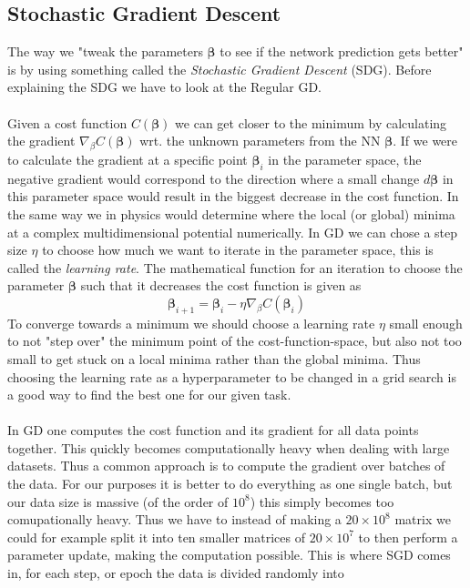 \documentclass[14pt, a4paper]{book}
\begin{document}
\subsection{Stochastic Gradient Descent}
The way we "tweak the parameters $\bm \beta $ to see if the network prediction gets better" is by using something called the \textit{Stochastic Gradient Descent} (SDG). Before explaining the SDG we have to look at the Regular GD. \\
\\Given a cost function $C(\bm{\beta})$ we can get closer to the minimum by calculating the gradient $\nabla_{\beta}C(\bm{\beta})$ wrt. the unknown parameters from the NN $\bm\beta$. If we were to calculate the gradient at a specific 
point $\bm{\beta}_i$ in the parameter space, the negative gradient would correspond to the direction where a small change $d\bm\beta$ in this parameter space would result in the biggest decrease in the cost function. 
In the same way we in physics would determine where the local (or global) minima at a complex multidimensional potential numerically. In GD we can chose a step size $\eta$ to choose how much we want to iterate in the parameter space, 
this is called the \textit{learning rate}. The mathematical function for an iteration to choose the parameter $\bm{\beta}$ such that it decreases the cost function is given as
\begin{equation}\label{eq:GD}
    \bm{\beta}_{i+1}=\bm{\beta}_{i} -\eta\nabla_{\beta}C(\bm{\beta}_i)
\end{equation}
To converge towards a minimum we should choose a learning rate $\eta$ small enough to not "step over" the minimum point of the cost-function-space, but also not too small to get stuck on a local minima rather than the global minima. 
Thus choosing the learning rate as a hyperparameter to be changed in a grid search is a good way to find the best one for our given task.\\
\\In GD one computes the cost function and its gradient for all data points together. This quickly becomes computationally heavy when dealing with large datasets. Thus a common approach is to compute the gradient over batches of the data. 
For our purposes it is better to do everything as one single batch, but our data size is massive (of the order of $10^{8}$) this simply becomes too comupationally heavy. Thus we have to instead of making a $20\times10^8$ matrix 
we could for example split it into ten smaller matrices of $20\times10^7$ to then perform a parameter update, making the computation possible. This is where SGD comes in, for each step, or epoch the data is divided randomly into 
\end{document}
